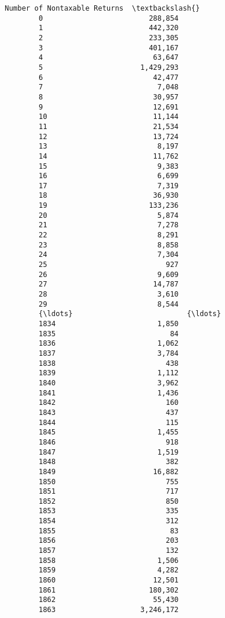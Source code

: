 \documentclass[11pt]{article}
\begin{document}
\begin{Verbatim}[commandchars=\\\{\}]
             Number of Nontaxable Returns  \textbackslash{}
        0                         288,854   
        1                         442,320   
        2                         233,305   
        3                         401,167   
        4                          63,647   
        5                       1,429,293   
        6                          42,477   
        7                           7,048   
        8                          30,957   
        9                          12,691   
        10                         11,144   
        11                         21,534   
        12                         13,724   
        13                          8,197   
        14                         11,762   
        15                          9,383   
        16                          6,699   
        17                          7,319   
        18                         36,930   
        19                        133,236   
        20                          5,874   
        21                          7,278   
        22                          8,291   
        23                          8,858   
        24                          7,304   
        25                            927   
        26                          9,609   
        27                         14,787   
        28                          3,610   
        29                          8,544   
        {\ldots}                           {\ldots}   
        1834                        1,850   
        1835                           84   
        1836                        1,062   
        1837                        3,784   
        1838                          438   
        1839                        1,112   
        1840                        3,962   
        1841                        1,436   
        1842                          160   
        1843                          437   
        1844                          115   
        1845                        1,455   
        1846                          918   
        1847                        1,519   
        1848                          382   
        1849                       16,882   
        1850                          755   
        1851                          717   
        1852                          850   
        1853                          335   
        1854                          312   
        1855                           83   
        1856                          203   
        1857                          132   
        1858                        1,506   
        1859                        4,282   
        1860                       12,501   
        1861                      180,302   
        1862                       55,430   
        1863                    3,246,172   
        

\end{Verbatim}
\end{document}
